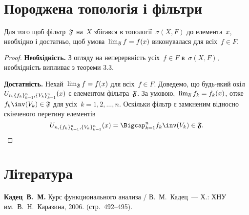\section{Породжена топологія і фільтри}

\begin{theorem}
    Для того щоб фільтр~$\frak F$ на~$X$ збігався в топології~$\sigma(X, F)$ до елемента~$x$, необхідно і достатньо, щоб умова~$\lim_{\frak F} f = f(x)$ виконувалася для всіх~$f \in F$.
\end{theorem}
\begin{proof}
    \textbf{Необхідність.} З огляду на неперервність усіх~$f \in F$ в~$\sigma(X, F)$, необхідність випливає з теореми 3.3.

    \textbf{Достатність.} Нехай~$\lim_{\frak F} f = f(x)$ для всіх~$f \in F$. Доведемо, що будь-який окіл~$U_{n,\{f_k\}_{k=1}^n,\{V_k\}_{k=1}^n}(x)$ є елементом фільтра~$\frak F$. За умовою,~$\lim_{\frak F} f_k = f_k(x)$, отже~$f_k\inv(V_k) \in \frak F$ для усіх~$k = 1, 2, \dots, n$. Оскільки фільтр є замкненим відносно скінченого перетину елементів
    \begin{equation*}
        \InducedNeighbourhood{x} = \Bigcap_{k = 1}^n f_k\inv(V_k) \in \frak F. \qedhere
    \end{equation*}
\end{proof}

\section{Література}

\begin{enumerate}[label={[\arabic*]}]
\item \textbf{Кадец~В.~М.}
Курс функционального анализа /
В.~М.~Кадец~---
Х.: ХНУ им.~В.~Н.~Каразина, 2006. (стр.~492--495).
\end{enumerate}
